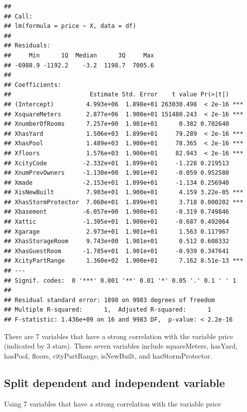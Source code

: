 \documentclass[
]{article}
\begin{document}
\begin{verbatim}
## 
## Call:
## lm(formula = price ~ X, data = df)
## 
## Residuals:
##     Min      1Q  Median      3Q     Max 
## -6988.9 -1192.2    -3.2  1198.7  7005.6 
## 
## Coefficients:
##                      Estimate Std. Error    t value Pr(>|t|)    
## (Intercept)         4.993e+06  1.898e+01 263030.498  < 2e-16 ***
## XsquareMeters       2.877e+06  1.900e+01 151480.243  < 2e-16 ***
## XnumberOfRooms      7.257e+00  1.901e+01      0.382 0.702640    
## XhasYard            1.506e+03  1.899e+01     79.289  < 2e-16 ***
## XhasPool            1.489e+03  1.900e+01     78.365  < 2e-16 ***
## Xfloors             1.576e+03  1.900e+01     82.943  < 2e-16 ***
## XcityCode          -2.332e+01  1.899e+01     -1.228 0.219513    
## XnumPrevOwners     -1.130e+00  1.901e+01     -0.059 0.952580    
## Xmade              -2.153e+01  1.899e+01     -1.134 0.256940    
## XisNewBuilt         7.903e+01  1.900e+01      4.159 3.22e-05 ***
## XhasStormProtector  7.060e+01  1.899e+01      3.718 0.000202 ***
## Xbasement          -6.057e+00  1.900e+01     -0.319 0.749846    
## Xattic             -1.305e+01  1.900e+01     -0.687 0.492064    
## Xgarage             2.973e+01  1.901e+01      1.563 0.117967    
## XhasStorageRoom     9.743e+00  1.901e+01      0.512 0.608332    
## XhasGuestRoom      -1.785e+01  1.901e+01     -0.939 0.347641    
## XcityPartRange      1.360e+02  1.900e+01      7.162 8.51e-13 ***
## ---
## Signif. codes:  0 '***' 0.001 '**' 0.01 '*' 0.05 '.' 0.1 ' ' 1
## 
## Residual standard error: 1898 on 9983 degrees of freedom
## Multiple R-squared:      1,  Adjusted R-squared:      1 
## F-statistic: 1.436e+09 on 16 and 9983 DF,  p-value: < 2.2e-16
\end{verbatim}

There are 7 variables that have a strong correlation with the variable
price (indicated by 3 stars). These seven variables include
squareMeters, hasYard, hasPool, floors, cityPartRange, isNewBuilt, and
hasStormProtector.

\subsection{Split dependent and independent
variable}\label{split-dependent-and-independent-variable}

Using 7 variables that have a strong correlation with the variable price
\end{document}

